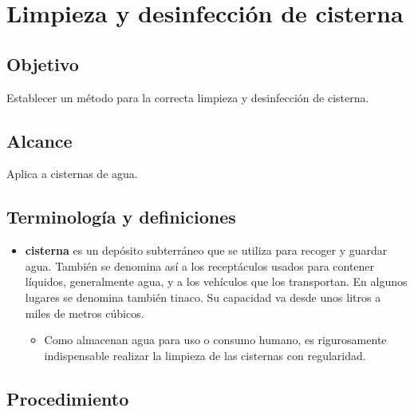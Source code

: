 \renewcommand{\MenorVer}{0}
\renewcommand{\MayorVer}{2}
\renewcommand{\Codigo}{HYS-23-IT}
\renewcommand{\FechaPub}{2023--01}
\renewcommand{\Titulo}{Limpieza y desinfección de cisterna}

\section{\Titulo}

\subsection{Objetivo}

Establecer un método para la correcta limpieza y desinfección de cisterna.

\subsection{Alcance}

Aplica a cisternas de agua.

\subsection{Terminología y definiciones}

\begin{itemize}
	\item \textbf{cisterna} es un depósito subterráneo que se utiliza para recoger y guardar agua. También se denomina así a los receptáculos usados para contener líquidos, generalmente agua, y a los vehículos que los transportan. En algunos lugares se denomina también tinaco. Su capacidad va desde unos litros a miles de metros cúbicos.
	\begin{itemize}
		\item Como almacenan agua para uso o consumo humano, es rigurosamente indispensable realizar la limpieza de las cisternas con regularidad.
	\end{itemize}
\end{itemize}

\subsection{Procedimiento}

